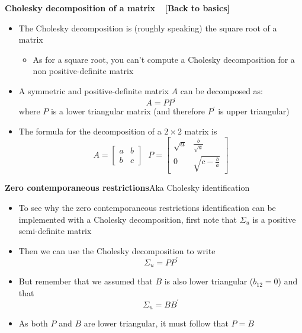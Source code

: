 \begin{frame}
{\color{note} \textbf{Cholesky decomposition of a matrix} \ {\footnotesize 
\textbf{[Back to basics]}}}\bigskip

\begin{itemize}
\item The Cholesky decomposition is (roughly speaking) the square root of a
matrix\smallskip

\begin{itemize}
\item As for a square root, you can't compute a Cholesky decomposition for a
non positive-definite matrix\bigskip
\end{itemize}

\item A symmetric and positive-definite matrix $A$ can be decomposed as:%
\begin{equation*}
A=PP^{\prime }
\end{equation*}%
where $P$ is a lower triangular matrix (and therefore $P^{\prime }$ is upper
triangular)\bigskip

\item The formula for the decomposition of a $2\times 2$ matrix is%
\begin{equation*}
A=%
\begin{bmatrix}
a & b \\ 
b & c%
\end{bmatrix}%
\ \ \ P=%
\begin{bmatrix}
\sqrt{a} & \frac{b}{\sqrt{a}} \\ 
0 & \sqrt{c-\frac{b}{a}}%
\end{bmatrix}%
\end{equation*}
\end{itemize}
\end{frame}


\begin{frame}
{\textbf{Zero contemporaneous restrictions}}{Aka Cholesky identification}%
\bigskip

\begin{itemize}
\item To see why the zero contemporaneous restrictions identification can be
implemented with a Cholesky decomposition, first note that $\Sigma _{u}$ is
a positive semi-definite matrix\bigskip

\item Then we can use the Cholesky decomposition to write 
\begin{equation*}
\Sigma _{u}=PP^{\prime }
\end{equation*}%
\pause

\item But remember that we assumed that $B$ is also lower triangular ($%
b_{12}=0$) and that%
\begin{equation*}
\Sigma _{u}=BB^{\prime }
\end{equation*}%
\pause

\item As both $P$ and $B$ are lower triangular, it must follow that $P=B$
\end{itemize}
\end{frame}

